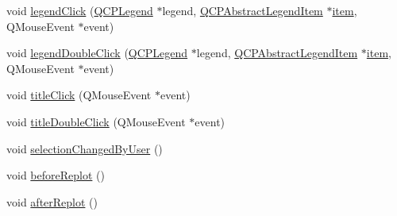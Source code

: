 \begin{DoxyCompactItemize}
\item 
void \hyperlink{classQCustomPlot_a79cff0baafbca10a3aaf694d2d3b9ab3}{legend\-Click} (\hyperlink{classQCPLegend}{Q\-C\-P\-Legend} $\ast$legend, \hyperlink{classQCPAbstractLegendItem}{Q\-C\-P\-Abstract\-Legend\-Item} $\ast$\hyperlink{classQCustomPlot_a3e842b5a65b1d17fbb96cfb1fa1314d1}{item}, Q\-Mouse\-Event $\ast$event)
\item 
void \hyperlink{classQCustomPlot_a0250f835c044521df1619b132288bca7}{legend\-Double\-Click} (\hyperlink{classQCPLegend}{Q\-C\-P\-Legend} $\ast$legend, \hyperlink{classQCPAbstractLegendItem}{Q\-C\-P\-Abstract\-Legend\-Item} $\ast$\hyperlink{classQCustomPlot_a3e842b5a65b1d17fbb96cfb1fa1314d1}{item}, Q\-Mouse\-Event $\ast$event)
\item 
void \hyperlink{classQCustomPlot_a969beb5e4b7e8864e5e349fcda4ce45b}{title\-Click} (Q\-Mouse\-Event $\ast$event)
\item 
void \hyperlink{classQCustomPlot_a854db02b12e8df49b5f998f17e8ee770}{title\-Double\-Click} (Q\-Mouse\-Event $\ast$event)
\item 
void \hyperlink{classQCustomPlot_a500c64a109bc773c973ad274f2fa4190}{selection\-Changed\-By\-User} ()
\item 
void \hyperlink{classQCustomPlot_a0cd30e29b73efd6afe096e44bc5956f5}{before\-Replot} ()
\item 
void \hyperlink{classQCustomPlot_a6f4fa624af060bc5919c5f266cf426a0}{after\-Replot} ()
\end{DoxyCompactItemize}

